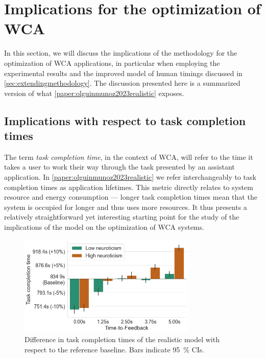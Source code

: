\section{Implications for the optimization of \acs{WCA}}

In this section, we will discuss the implications of the methodology for the optimization of \gls{WCA} applications, in particular when employing the experimental results and the improved model of human timings discussed in \cref{sec:extendingmethodology}.
The discussion presented here is a summarized version of what \cref{paper:olguinmunoz2023realistic} exposes.


\subsection{Implications with respect to task completion times}

The term \emph{task completion time}, in the context of \gls{WCA}, will refer to the time it takes a user to work their way through the task presented by an assistant application.
In \cref{paper:olguinmunoz2023realistic} we refer interchangeably to task completion times as application lifetimes.
This metric directly relates to system resource and energy consumption --- longer task completion times mean that the system is occupied for longer and thus uses more resources.
It thus presents a relatively straightforward yet interesting starting point for the study of the implications of the model on the optimization of \gls{WCA} systems.

\begin{figure}
    \centering
    \includegraphics[height=13em]{Figs/2023EdgeDroid2/task_durations_diff}
    \caption{Difference in task completion times of the realistic model with respect to the reference baseline.
    Bars indicate \SI{95}{\percent} \glspl{CI}.}\label{fig:taskcompletiontimesdiff}
\end{figure}

